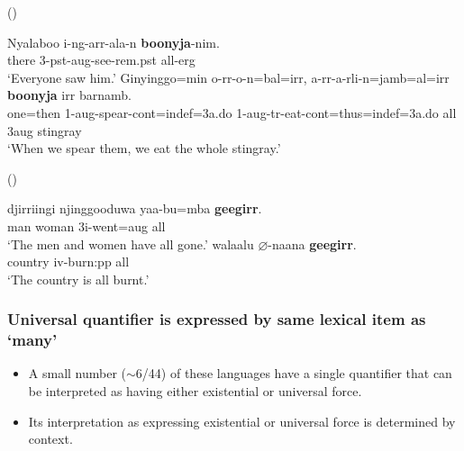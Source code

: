 \documentclass{article}
\begin{document}
\begin{exe}
 (\citealt[272]{bowern12})
\begin{xlist}
\ex \gll Nyalaboo i-ng-arr-ala-n \textbf{boonyja}-nim.\\
there 3-{\sc pst}-{\sc aug}-see-{\sc rem.pst} all-{\sc erg}\\
\glt `Everyone saw him.' \label{univ1}%
\ex \gll Ginyinggo=min o-rr-o-n=bal=irr, a-rr-a-rli-n=jamb=al=irr \textbf{boonyja} irr barnamb.\\
one={\sc then} 1-{\sc aug}-spear-{\sc cont}={\sc indef}=3{\sc a.do} 1-{\sc aug}-{\sc tr}-eat-{\sc cont}={\sc thus}={\sc indef}=3{\sc a.do} all 3{\sc aug} stingray\\
\glt `When we spear them, we eat the whole stingray.' \label{univ2} %
\end{xlist}
 (\citealt[307]{harvey92})
\begin{xlist}
\ex \gll djirriingi njinggooduwa yaa-bu=mba \textbf{geegirr}.\\
man woman 3{\sc i}-went={\sc aug} all\\
\glt `The men and women have all gone.'
\ex \gll walaalu $\varnothing$-naana \textbf{geegirr}.\\
country {\sc iv}-burn:{\sc pp} all\\
\glt `The country is all burnt.'
\end{xlist}
\end{exe}


\subsubsection{Universal quantifier is expressed by same lexical item as `many'}

\begin{itemize}
    \item A small number  ($\sim$6/44) of these languages have a single quantifier that can be interpreted as having either existential or universal force.
    \item Its interpretation as expressing existential or universal force is determined by context.
\end{itemize}

\newpage
\end{document}

